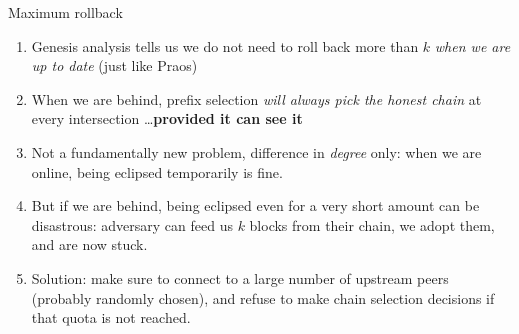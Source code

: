 \documentclass[usenames,dvipsnames,t]{beamer}
\begin{document}
\begin{frame}{Maximum rollback}

\begin{enumerate}

\item Genesis analysis tells us we do not need to roll back more than $k$
\emph{when we are up to date} (just like Praos)

\item When we are behind, prefix selection \emph{will always pick the honest
chain} at every intersection \dots \pause \textbf{provided it can see it}

\pause

\item Not a fundamentally new problem, difference in \emph{degree} only: when we are online, being eclipsed temporarily is fine.

\item But if we are behind, being eclipsed even for a very short amount can be disastrous: adversary can feed us $k$ blocks from their chain, we adopt them,
and are now stuck.

\pause

\item Solution: make sure to connect to a large number of upstream peers
(probably randomly chosen), and refuse to make chain selection decisions if
that quota is not reached.

\end{enumerate}

\end{frame}

\end{document}
